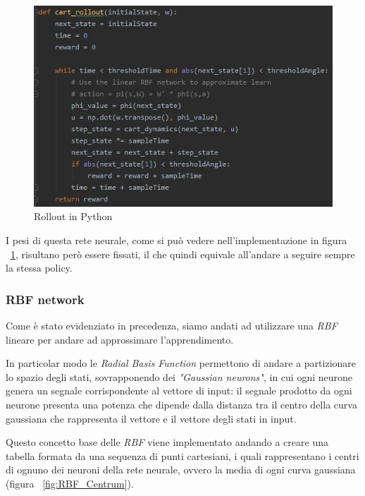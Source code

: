 \begin{figure}[!h]
	\centering
	\includegraphics[width=\textwidth]{Immagini/Rollout.JPG}
	\caption{Rollout in Python}
	\label{fig:roll_py}
\end{figure}

I pesi di questa rete neurale, come si può vedere nell'implementazione in figura ~\ref{fig:roll_py}, risultano però essere fissati, il che quindi equivale all'andare a seguire sempre la stessa policy.
\subsubsection{RBF network}
\label{sec:RBF}
Come è stato evidenziato in precedenza, siamo andati ad utilizzare una \textit{RBF} lineare per andare ad approssimare l'apprendimento.

In particolar modo le \textit{Radial Basis Function} permettono di andare a partizionare lo spazio degli stati, sovrapponendo dei \textit{"Gaussian neurons"}, in cui ogni neurone genera un segnale corrispondente al vettore di input: il segnale prodotto da ogni neurone presenta una potenza che dipende dalla distanza tra il centro della curva gaussiana che rappresenta il vettore e il vettore degli stati in input.

Questo concetto base delle \textit{RBF} viene implementato andando a creare una tabella formata da una sequenza di punti cartesiani, i quali rappresentano i centri di ognuno dei neuroni della rete neurale, ovvero la media di ogni curva gaussiana (figura ~\ref{fig:RBF_Centrum}).


